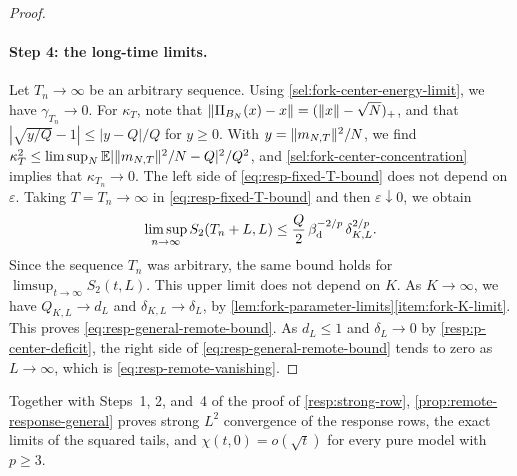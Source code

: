 \begin{proof}
\paragraph{Step 4: the long-time limits.}
Let $T_n\to\infty$ be an arbitrary sequence. Using \eqref{sel:fork-center-energy-limit}, we have $\gamma_{T_n}\to0$. For $\kappa_T$, note that $\lVert\Pi_{B_N}(x)-x\rVert=(\lVert x\rVert-\sqrt N)_+$, and that $|\sqrt{y/Q}-1|\le|y-Q|/Q$ for $y\ge0$. With $y=\lVert m_{N,T}\rVert^2/N$, we find $\kappa_T^2\le\limsup_N\mathbb E|\lVert m_{N,T}\rVert^2/N-Q|^2/Q^2$, and \eqref{sel:fork-center-concentration} implies that $\kappa_{T_n}\to0$. The left side of \eqref{eq:resp-fixed-T-bound} does not depend on $\varepsilon$. Taking $T=T_n\to\infty$ in \eqref{eq:resp-fixed-T-bound} and then $\varepsilon\downarrow0$, we obtain
\[
 \limsup_{n\to\infty}S_2(T_n+L,L)\le\frac Q2\,\beta_{\mathrm d}^{-2/p}\,\delta_{K,L}^{2/p}.
\]
Since the sequence $T_n$ was arbitrary, the same bound holds for $\limsup_{t\to\infty}S_2(t,L)$. This upper limit does not depend on $K$. As $K\to\infty$, we have $Q_{K,L}\to d_L$ and $\delta_{K,L}\to\delta_L$, by \cref{lem:fork-parameter-limits}\ref{item:fork-K-limit}. This proves \eqref{eq:resp-general-remote-bound}. As $d_L\le1$ and $\delta_L\to0$ by \eqref{resp:p-center-deficit}, the right side of \eqref{eq:resp-general-remote-bound} tends to zero as $L\to\infty$, which is \eqref{eq:resp-remote-vanishing}.
\end{proof}

Together with Steps~1, 2, and~4 of the proof of \cref{resp:strong-row}, \cref{prop:remote-response-general} proves strong $L^2$ convergence of the response rows, the exact limits of the squared tails, and $\chi(t,0)=o(\sqrt t)$ for every pure model with $p\ge3$.
